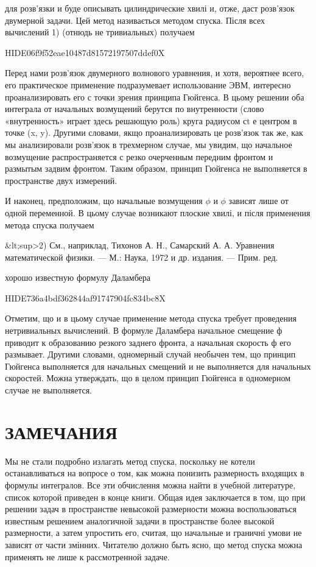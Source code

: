 \documentclass[
  ukrainian,
]{article}
\begin{document}
для розв'язки и буде описывать цилиндрические хвилі и, отже, даст
розв'язок двумерной задачи. Цей метод називається методом спуска. Після
всех вычислений 1) (отнюдь не тривиальных) получаем

HIDE06f9f52eae10487d81572197507ddef0X

Перед нами розв'язок двумерного волнового уравнения, и хотя, вероятнее
всего, его практическое применение подразумевает использование ЭВМ,
интересно проанализировать его с точки зрения принципа Гюйгенса. В цьому
решении оба интеграла от начальных возмущений берутся по внутренности
(слово «внутренность» играет здесь решающую роль) круга радиусом сt е
центром в точке (x, y). Другими словами, якщо проанализировать це
розв'язок так же, как мы анализировали розв'язок в трехмерном случае, мы
увидим, що начальное возмущение распространяется с резко очерченным
передним фронтом и размытым задвим фронтом. Таким образом, принцип
Гюйгенса не выполняется в пространстве двух измерений.

И наконец, предположим, що начальные возмущения \(\phi\) и \(\phi\)
зависят лише от одной переменной. В цьому случае возникают плоские
хвилі, и після применения метода спуска получаем

\&lt;sup\textgreater2) См., наприклад, Тихонов А. Н., Самарский А. А.
Уравнения математической физики. --- М.: Наука, 1972 и др. издания. ---
Прим. ред.

хорошо известную формулу Даламбера

HIDE736a4bdf362844af91747904fc834bc8X

Отметим, що и в цьому случае применение метода спуска требует проведения
нетривиальных вычислений. В формуле Даламбера начальное смещение ф
приводит к образованию резкого заднего фронта, а начальная скорость ф
его размывает. Другими словами, одномерный случай необычен тем, що
принцип Гюйгенса выполняется для начальных смещений и не выполняется для
начальных скоростей. Можна утверждать, що в целом принцип Гюйгенса в
одномерном случае не выполняется.

\section{ЗАМЕЧАНИЯ}\label{ux437ux430ux43cux435ux447ux430ux43dux438ux44f-8}

Мы не стали подробно излагать метод спуска, поскольку не котели
останавливаться на вопросе о том, как можна понизить размерность
входящих в формулы интегралов. Все эти обчислення можна найти в учебной
литературе, список которой приведен в конце книги. Общая идея
заключается в том, що при решении задач в пространстве невысокой
размерности можна воспользоваться известным решением аналогичной задачи
в пространстве более высокой размерности, а затем упростить его, считая,
що начальные и граничні умови не зависят от части змінних. Читателю
должно быть ясно, що метод спуска можна применять не лише к
рассмотренной задаче.
\end{document}
